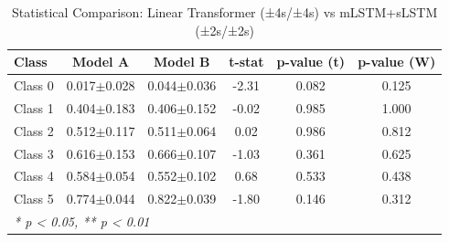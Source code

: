 \begin{table}[htbp]
\centering
\caption{Statistical Comparison: Linear Transformer (±4s/±4s) vs mLSTM+sLSTM (±2s/±2s)}
\label{tab:comparison_class_linear_transformer_±4s_±4s_vs_mlstmslstm_±2s_±2s}
\begin{tabular}{lccccc}
\toprule
\textbf{Class} & \textbf{Model A} & \textbf{Model B} & \textbf{t-stat} & \textbf{p-value (t)} & \textbf{p-value (W)} \\
\midrule
Class 0 & 0.017$\pm$0.028 & 0.044$\pm$0.036 & -2.31 & 0.082 & 0.125 \\
Class 1 & 0.404$\pm$0.183 & 0.406$\pm$0.152 & -0.02 & 0.985 & 1.000 \\
Class 2 & 0.512$\pm$0.117 & 0.511$\pm$0.064 & 0.02 & 0.986 & 0.812 \\
Class 3 & 0.616$\pm$0.153 & 0.666$\pm$0.107 & -1.03 & 0.361 & 0.625 \\
Class 4 & 0.584$\pm$0.054 & 0.552$\pm$0.102 & 0.68 & 0.533 & 0.438 \\
Class 5 & 0.774$\pm$0.044 & 0.822$\pm$0.039 & -1.80 & 0.146 & 0.312 \\
\bottomrule
\multicolumn{6}{l}{\textit{* p < 0.05, ** p < 0.01}} \\
\end{tabular}
\end{table}